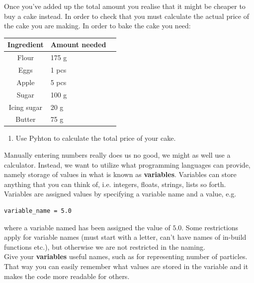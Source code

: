 \documentclass{article}
\begin{document}
Once you've added up the total amount you realise that it might be cheaper to buy a cake instead.
In order to check that you must calculate the actual price of the cake you are making.
In order to bake the cake you need:

\begin{center}
    \begin{tabular}{c l l}
    \hline
    Ingredient & Amount needed\\
    \hline
    Flour & 175 g \\
    Eggs & 1 pcs \\
    Apple & 5 pcs \\
    Sugar & 100 g \\
    Icing sugar &  20 g \\
    Butter & 75 g \\
    \end{tabular}
\end{center}

\begin{enumerate}[resume]

    \item Use Pyhton to calculate the total price of your cake.
 
\end{enumerate}


Manually entering numbers really does us no good, we might as well use a calculator.
Instead, we want to utilize what programming languages can provide,
namely storage of values in what is known as {\bf variables}.
Variables can store anything that you can think of, i.e. integers, floats, strings, lists so forth.
Variables are assigned values by specifying a variable name and a value, e.g.

\begin{lstlisting}
variable_name = 5.0
\end{lstlisting}

where a variable named  has been assigned the value
of $5.0$.
Some restrictions apply for variable names (must start with a letter, can't have names of in-build functions etc.), but otherwise we are not restricted in the naming.\\

Give your {\bf variables} useful names, such as  for representing number of particles.
That way you can easily remember what values are stored in the variable and it makes the code more readable for others.
\end{document}
